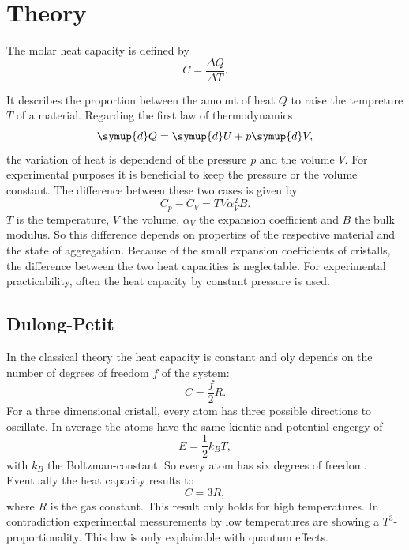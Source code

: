 \section{Theory}
\label{sec:Theorie}

The molar heat capacity is defined by 
\begin{equation}
    C = \frac{\Delta Q}{\Delta T}.
\end{equation}

It describes the proportion between the amount of heat $Q$ to raise the tempreture $T$ of a material. 
Regarding the first law of thermodynamics
\begin{equation}
    \symup{d}Q = \symup{d}U+p\symup{d}V,
\end{equation}
the variation of heat is dependend of the pressure $p$ and the volume $V$.
For experimental purposes it is beneficial to keep the pressure or the volume constant.
The difference between these two cases is given by
\begin{equation}
    C_p - C_V = TV \alpha_V^2 B.
\end{equation}
$T$ is the temperature, $V$ the volume, $\alpha_V$ the expansion coefficient and $B$ the bulk modulus.
So this difference depends on properties of the respective material and the state of aggregation. 
Because of the small expansion coefficients of cristalls, the difference between the two heat capacities is neglectable.
For experimental practicability, often the heat capacity by constant pressure is used.


\subsection{Dulong-Petit}
In the classical theory the heat capacity is constant and oly depends on the number of degrees of freedom $f$ of the system:
\begin{equation}
    C = \frac{f}{2} R.
\end{equation} 
For a three dimensional cristall, every atom has three possible directions to oscillate. 
In average the atoms have the same kientic and potential engergy of 
\begin{equation}
    E = \frac{1}{2}k_B T,
\end{equation}
with $k_B$ the Boltzman-constant.
So every atom has six degrees of freedom. 
Eventually the heat capacity results to
\begin{equation}
    C = 3 R,
\end{equation}
where $R$ is the gas constant.
This result only holds for high temperatures. 
In contradiction experimental messurements by low temperatures are showing a $T^3$-proportionality.
This law is only explainable with quantum effects.

